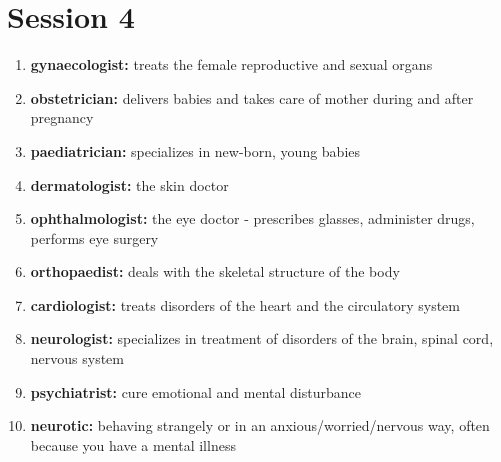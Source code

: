 \documentclass{article}
\begin{document}
\section{Session 4}
\begin{enumerate}
    \item \textbf{gynaecologist: }{treats the female reproductive and sexual organs}
    \item \textbf{obstetrician: }{delivers babies and takes care of mother during and after pregnancy}
    \item \textbf{paediatrician: }{specializes in new-born, young babies}
    \item \textbf{dermatologist: }{the skin doctor}
    \item \textbf{ophthalmologist: }{the eye doctor - prescribes glasses, administer drugs, performs eye surgery}
    \item \textbf{orthopaedist: }{deals with the skeletal structure of the body}
    \item \textbf{cardiologist: }{treats disorders of the heart and the circulatory system}
    \item \textbf{neurologist: }{specializes in treatment of disorders of the brain, spinal cord, nervous system}
    \item \textbf{psychiatrist: }{cure emotional and mental disturbance}
    \item \textbf{neurotic: }{behaving strangely or in an anxious/worried/nervous way, often because you have a mental illness}
    
\end{enumerate}
\end{document}
